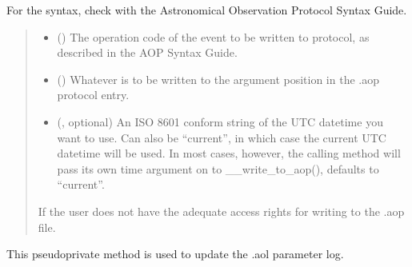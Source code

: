 \documentclass[letterpaper,10pt,english]{sphinxmanual}
\begin{document}
\begin{fulllineitems}
\begin{fulllineitems}
\sphinxAtStartPar
For the syntax, check with the Astronomical Observation Protocol Syntax
Guide.
\begin{quote}\begin{description}
\begin{itemize}
\item {} 
\sphinxAtStartPar
{} () \textendash{} The operation code of the event to be written to protocol, as
described in the AOP Syntax Guide.

\item {} 
\sphinxAtStartPar
{} () \textendash{} Whatever is to be written to the argument position in the .aop
protocol entry.

\item {} 
\sphinxAtStartPar
{} (, optional) \textendash{} An ISO 8601 conform string of the UTC datetime you want to use. Can also be “current”, in which
case the current UTC datetime will be used.
In most cases, however, the calling method will pass its own time
argument on to \_\_write\_to\_aop(), defaults to “current”.

\end{itemize}

\sphinxAtStartPar
{} \textendash{} If the user does not have the adequate access rights for writing to the .aop file.

\end{description}\end{quote}

\end{fulllineitems}


\begin{fulllineitems}
\label{\detokenize{autoapi/aop/aop/index:aop.aop.Session.__write_to_aol}}
\pysigstartsignatures
{}
\pysigstopsignatures
\sphinxAtStartPar
This pseudo\sphinxhyphen{}private method is used to update the .aol parameter log.


\end{fulllineitems}
\end{fulllineitems}
\end{document}
